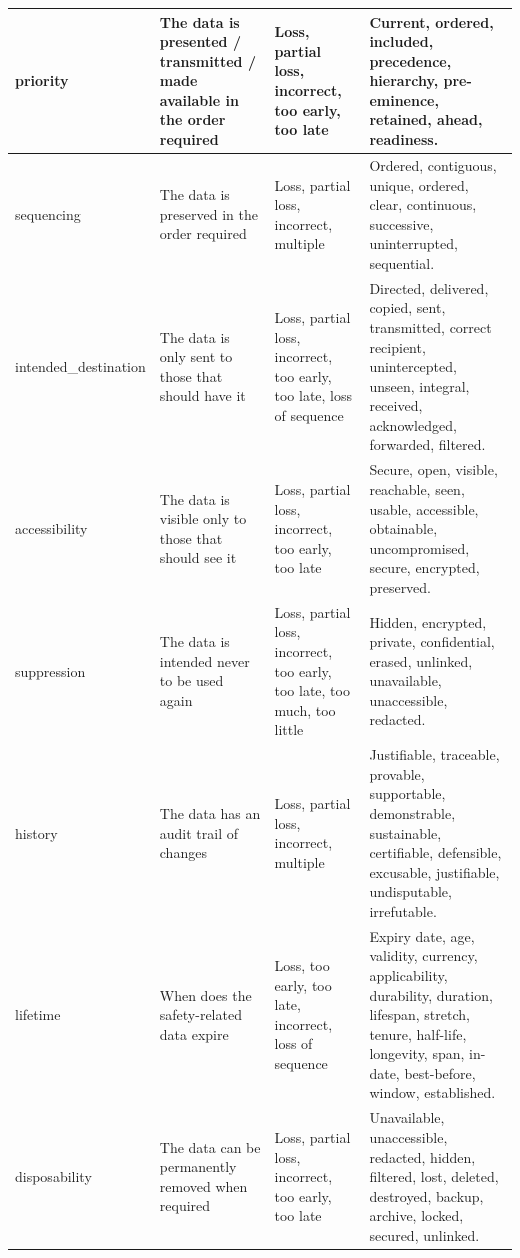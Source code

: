 \begin{longtable}{|L{}|L{}|L{}|L{}|}
  \hline
  \Gls{priority} & The data is presented / transmitted / made available in the order required & Loss, partial loss, incorrect, too early, too late & Current, ordered, included, precedence, hierarchy, pre-eminence, retained, ahead, readiness.\\
  \hline
  \Gls{sequencing} & The data is preserved in the order required & Loss, partial loss, incorrect, multiple & Ordered, contiguous, unique, ordered, clear, continuous, successive, uninterrupted, sequential.\\
  \hline
  \Gls{intended_destination} & The data is only sent to those that should have it & Loss, partial loss, incorrect, too early, too late, loss of sequence & Directed, delivered, copied, sent, transmitted, correct recipient, unintercepted, unseen, integral, received, acknowledged, forwarded, filtered.\\
  \hline
  \Gls{accessibility} & The data is visible only to those that should see it & Loss, partial loss, incorrect, too early, too late & Secure, open, visible, reachable, seen, usable, accessible, obtainable, uncompromised, secure, encrypted, preserved.\\
  \hline
  \Gls{suppression} & The data is intended never to be used again & Loss, partial loss, incorrect, too early, too late, too much, too little & Hidden, encrypted, private, confidential, erased, unlinked, unavailable, unaccessible, redacted.\\
  \hline
  \Gls{history} & The data has an audit trail of changes & Loss, partial loss, incorrect, multiple & Justifiable, traceable, provable, supportable, demonstrable, sustainable, certifiable, defensible, excusable, justifiable, undisputable, irrefutable.\\
  \hline
  \Gls{lifetime} & When does the safety-related data expire & Loss, too early, too late, incorrect, loss of sequence & Expiry date, age, \gls{validity}, currency, applicability, durability, duration, lifespan, stretch, tenure, half-life, longevity, span, in-date, best-before, window, established.\\
  \hline
  \Gls{disposability} & The data can be permanently removed when required & Loss, partial loss, incorrect, too early, too late & Unavailable, unaccessible, redacted, hidden, filtered, lost, deleted, destroyed, backup, archive, locked, secured, unlinked.\\

\end{longtable}
